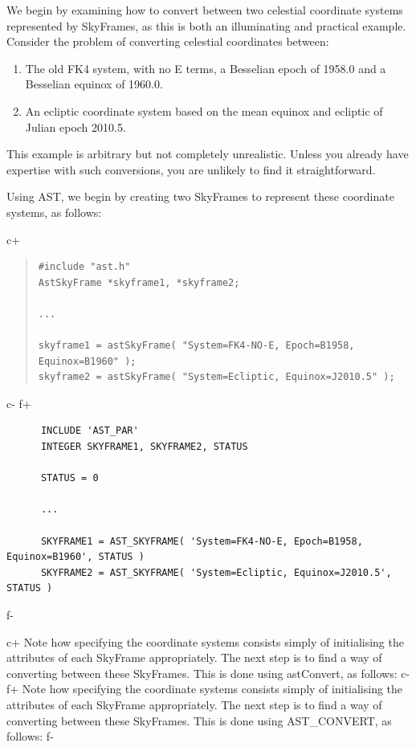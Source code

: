 \documentclass[twoside,11pt]{article}
\begin{document}
We begin by examining how to convert between two celestial coordinate
systems represented by SkyFrames, as this is both an illuminating and
practical example.  Consider the problem of converting celestial
coordinates between:

\begin{enumerate}
\item The old FK4 system, with no E terms, a Besselian epoch of
1958.0 and a Besselian equinox of 1960.0.

\item An ecliptic coordinate system based on the mean equinox and
ecliptic of Julian epoch 2010.5.
\end{enumerate}

This example is arbitrary but not completely unrealistic. Unless you
already have expertise with such conversions, you are unlikely to find
it straightforward.

Using AST, we begin by creating two SkyFrames to represent these
coordinate systems, as follows:

c+
\begin{quote}
\small
\begin{verbatim}
#include "ast.h"
AstSkyFrame *skyframe1, *skyframe2;

...

skyframe1 = astSkyFrame( "System=FK4-NO-E, Epoch=B1958, Equinox=B1960" );
skyframe2 = astSkyFrame( "System=Ecliptic, Equinox=J2010.5" );
\end{verbatim}
\normalsize
\end{quote}
c-
f+
\small
\begin{verbatim}
      INCLUDE 'AST_PAR'
      INTEGER SKYFRAME1, SKYFRAME2, STATUS

      STATUS = 0

      ...

      SKYFRAME1 = AST_SKYFRAME( 'System=FK4-NO-E, Epoch=B1958, Equinox=B1960', STATUS )
      SKYFRAME2 = AST_SKYFRAME( 'System=Ecliptic, Equinox=J2010.5', STATUS )
\end{verbatim}
\normalsize
f-

c+
Note how specifying the coordinate systems consists simply of
initialising the attributes of each SkyFrame appropriately.  The next
step is to find a way of converting between these SkyFrames. This is
done using astConvert, as follows:
c-
f+
Note how specifying the coordinate systems consists simply of
initialising the attributes of each SkyFrame appropriately.  The next
step is to find a way of converting between these SkyFrames. This is
done using AST\_CONVERT, as follows:
f-
\end{document}
